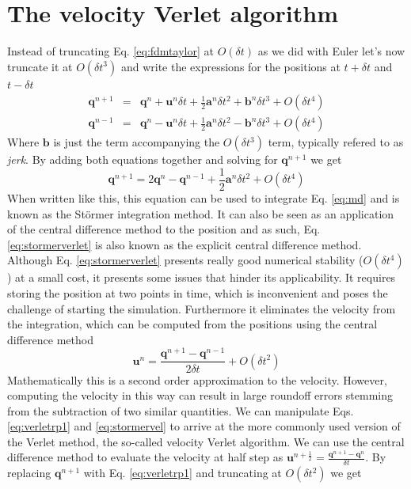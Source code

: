 \documentclass[ twoside,openright,titlepage,numbers=noenddot,%
headinclude,footinclude,cleardoublepage=empty,abstract=on,
BCOR=5mm,paper=b5,fontsize=11pt, dvipsnames
]{scrreprt}
\renewcommand{\vec}[1]{\bm{#1}}
\newcommand{\dt}{\delta t}
\newcommand{\half}{\frac{1}{2}}
\newcommand{\ppos}{q}
\newcommand{\pvel}{u}
\begin{document}
\section{The velocity Verlet algorithm}\label{sec:velocityverlet}
Instead of truncating Eq. \eqref{eq:fdmtaylor} at $O(\dt)$ as we did with Euler let's now truncate it at $O(\dt^3)$ and write the expressions for the positions at $t+\dt$ and $t-\dt$
\begin{eqnarray}
  \label{eq:verletrp1}
  \vec{\ppos}^{n+1} &=& \vec{\ppos}^n + \vec{\pvel}^n\dt + \half\vec{a}^n\dt^2 + \vec{b}^n\dt^3 + O(\dt^4)\\
  \vec{\ppos}^{n-1} &=& \vec{\ppos}^n - \vec{\pvel}^n\dt + \half\vec{a}^n\dt^2 - \vec{b}^n\dt^3 + O(\dt^4)
\end{eqnarray}
Where $\vec{b}$ is just the term accompanying the $O(\dt^3)$ term, typically refered to as \emph{jerk}.
By adding both equations together and solving for $\vec{\ppos}^{n+1}$ we get
\begin{equation}
  \label{eq:stormerverlet}
  \vec{\ppos}^{n+1} = 2\vec{\ppos}^n - \vec{\ppos}^{n-1} + \half\vec{a}^n\dt^2 + O(\dt^4)
\end{equation}
When written like this, this equation can be used to integrate Eq. \eqref{eq:md} and is known as the Störmer integration method. It can also be seen as an application of the central difference method to the position and as such, Eq. \eqref{eq:stormerverlet} is also known as the explicit central difference method.
Although Eq. \eqref{eq:stormerverlet} presents really good numerical stability ($O(\dt^4)$) at a small cost, it presents some issues that hinder its applicability.
It requires storing the position at two points in time, which is inconvenient and poses the challenge of starting the simulation.
Furthermore it eliminates the velocity from the integration, which can be computed from the positions using the central difference method
\begin{equation}
  \label{eq:stormervel}
  \vec{\pvel}^n = \frac{\vec{\ppos} ^{n+1} - \vec{\ppos}^{n-1}}{2\dt} + O(\dt^2)
\end{equation}
Mathematically this is a second order approximation to the velocity. However, computing the velocity in this way can result in large roundoff errors stemming from the subtraction of two similar quantities.
We can manipulate Eqs. \eqref{eq:verletrp1} and \eqref{eq:stormervel} to arrive at the more commonly used version of the Verlet method, the so-called velocity Verlet algorithm.
We can use the central difference method to evaluate the velocity at half step as $\vec{\pvel}^{n+\half} = \frac{\vec{\ppos}^{n+1} - \vec{\ppos}^n}{\dt}$. By replacing $\vec{\ppos}^{n+1}$ with Eq. \eqref{eq:verletrp1} and truncating at $O(\dt^2)$ we get
\end{document}
